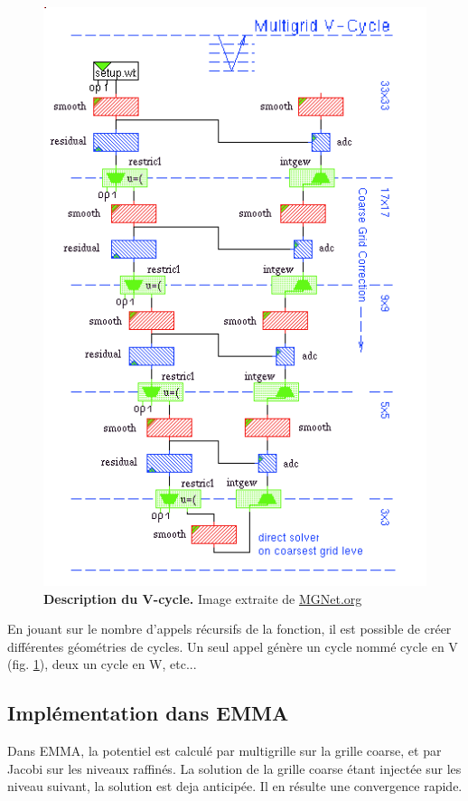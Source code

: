 \begin{figure}[htbp]
\begin{center}
\includegraphics[scale=0.35]{img/02/Vcycle.png}
\caption{\textbf{Description du V-cycle.} Image extraite de \href{http://MGNet.org}{MGNet.org}}
\label{Description du V-cycle}
\end{center}
\end{figure}		

En jouant sur le nombre d'appels récursifs de la fonction, il est possible de créer différentes géométries de cycles. 
Un seul appel génère un cycle nommé cycle en V (fig. \ref{Description du V-cycle}), deux un cycle en W, etc... 

\subsection{Implémentation dans EMMA}
Dans EMMA, la potentiel est calculé par multigrille sur la grille coarse, et par Jacobi sur les niveaux raffinés.
La solution de la grille coarse étant injectée sur les niveau suivant, la solution est deja anticipée. 
Il en résulte une convergence rapide.


